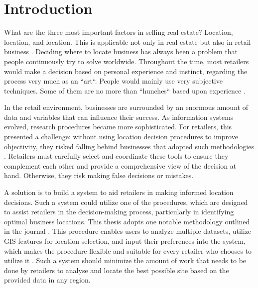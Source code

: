 \chapter{Introduction}
\label{ch:1}

What are the three most important factors in selling real estate? Location, location, and location. This is applicable not only in real estate but also in retail business \cite{anderson1997location}. Deciding where to locate business has always been a problem that people continuously try to solve worldwide. Throughout the time, most retailers would make a decision based on personal experience and instinct, regarding the process very much as an ``art``. People would mainly use very subjective techniques. Some of them are no more than ``hunches`` based upon experience \cite{hernandez2000art}.

In the retail environment, businesses are surrounded by an enormous amount of data and variables that can influence their success. As information systems evolved, research procedures became more sophisticated. For retailers, this presented a challenge: without using location decision procedures to improve objectivity, they risked falling behind businesses that adopted such methodologies \cite{hernandez2000art}. Retailers must carefully select and coordinate these tools to ensure they complement each other and provide a comprehensive view of the decision at hand. Otherwise, they risk making false decisions or mistakes.

A solution is to build a system to aid retailers in making informed location decisions. Such a system could utilize one of the procedures, which are designed to assist retailers in the decision-making process, particularly in identifying optimal business locations. This thesis adopts one notable methodology outlined in the journal \cite{roig2013retail}. This procedure enables users to analyze multiple datasets, utilize GIS features for location selection, and input their preferences into the system, which makes the procedure flexible and suitable for every retailer who chooses to utilize it \cite{roig2013retail}. Such a system should minimize the amount of work that needs to be done by retailers to analyse and locate the best possible site based on the provided data in any region.

